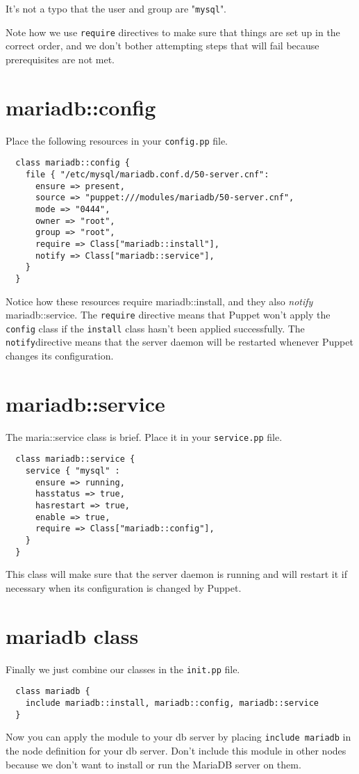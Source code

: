 \documentclass{article}   	%
\begin{document}
It's not a typo that the user and group are "\texttt{mysql}".

Note how we use \texttt{require} directives to make sure that things are set up in the correct order, and we don't bother attempting steps that will fail because prerequisites are not met.



\newpage

\section{mariadb::config}
Place the following resources in your \texttt{config.pp} file.

\begin{verbatim}
  class mariadb::config {
    file { "/etc/mysql/mariadb.conf.d/50-server.cnf":
      ensure => present,
      source => "puppet:///modules/mariadb/50-server.cnf",
      mode => "0444",
      owner => "root",
      group => "root",
      require => Class["mariadb::install"],
      notify => Class["mariadb::service"],
    }
  }
\end{verbatim}

Notice how these resources require mariadb::install, and they also \emph{notify} mariadb::service.  The \texttt{require} directive means that Puppet won't apply the \texttt{config} class if the \texttt{install} class hasn't been applied successfully. The \texttt{notify}directive means that the server daemon will be restarted whenever Puppet changes its configuration.

\section{mariadb::service}
The maria::service class is brief.  Place it in your \texttt{service.pp} file.

\begin{verbatim}
  class mariadb::service {
    service { "mysql" :
      ensure => running,
      hasstatus => true,
      hasrestart => true,
      enable => true,
      require => Class["mariadb::config"],
    }
  }
\end{verbatim}

This class will make sure that the server daemon is running and will restart it if necessary when its configuration is changed by Puppet.

\section{mariadb class}

Finally we just combine our classes in the \texttt{init.pp} file.

\begin{verbatim}
  class mariadb {
    include mariadb::install, mariadb::config, mariadb::service
  }
\end{verbatim}

Now you can apply the module to your db server by placing \texttt{include mariadb} in the node definition for your db server. Don't include this module in other nodes because we don't want to install or run the MariaDB server on them.
\end{document}
